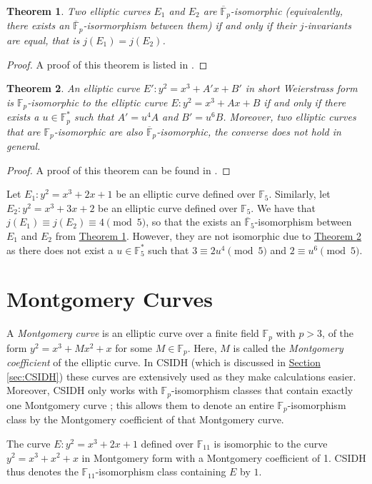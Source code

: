 \documentclass[openany, a4paper, 10pt]{book}
\theoremstyle{plain}
\newtheorem{theorem}{Theorem}[chapter]
\theoremstyle{plain}
\theoremstyle{plain}
\theoremstyle{definition}
\theoremstyle{plain}
\theoremstyle{definition}
\theoremstyle{remark}
\newcommand{\theoref}[1]{\hyperref[#1]{Theorem \ref{#1}}}
\newcommand{\secref}[1]{\hyperref[#1]{Section \ref{#1}}}
\begin{document}
\begin{theorem}\label{j-isomorphic}
    Two elliptic curves $E_1$ and $E_2$ are $\overline{\mathbb F}_p$-isomorphic (equivalently, there exists an $\overline{\mathbb F}_p$-isormorphism between them) if and only if their $j$-invariants are equal, that is $j(E_1) = j(E_2)$.
\end{theorem}
\begin{proof}
    A proof of this theorem is listed in \cite[III.1.4(b)]{arithmetic}.
\end{proof}
\begin{theorem}\label{Fp-isomorphic}
    An elliptic curve $E': y^2 = x^3+A'x + B'$ in short Weierstrass form is $\mathbb F_p$-isomorphic to the elliptic curve $E: y^2 = x^3+Ax+B$ if and only if there exists a $u \in \mathbb F_p^*$ such that $A' = u^4A$ and $B' = u^6B$.
    Moreover, two elliptic curves that are $\mathbb F_p$-isomorphic are also $\overline{\mathbb F}_p$-isomorphic, the converse does not hold in general.
\end{theorem}
\begin{proof}
    A proof of this theorem can be found in \cite[Theorems~2.2.2-2.2.4]{isom_class}.
\end{proof}

\begin{examplebox}


    Let $E_1: y^2 = x^3 + 2x + 1$ be an elliptic curve defined over $\mathbb F_5$.
    Similarly, let $E_2: y^2 = x^3+3x+2$ be an elliptic curve defined over $\mathbb F_5$.
    We have that $j(E_1) \equiv j(E_2) \equiv 4 \pmod 5$, so that the exists an $\overline{\mathbb F}_5$-isomorphism between $E_1$ and $E_2$ from \theoref{j-isomorphic}.
    However, they are not isomorphic due to \theoref{Fp-isomorphic} as there does not exist a $u \in \mathbb F_5^*$ such that $3\equiv 2u^4 \pmod 5$ and $2 \equiv u^6 \pmod 5$.
\end{examplebox}


\section{Montgomery Curves}\label{sec:mont_curves}
A \textit{Montgomery curve} is an elliptic curve over a finite field $\mathbb F_p$ with $p>3$, of the form $y^2=x^3+Mx^2+x$ for some $M \in \mathbb F_p$.
Here, $M$ is called the \textit{Montgomery coefficient} of the elliptic curve.
In CSIDH \cite{CSIDH} (which is discussed in \secref{sec:CSIDH}) these curves are extensively used as they make calculations easier.
Moreover, CSIDH only works with $\mathbb F_p$-isomorphism classes that contain exactly one Montgomery curve \cite[p.~5]{CSIDH}; this allows them to denote an entire $\mathbb F_p$-isomorphism class by the Montgomery coefficient of that Montgomery curve.
\begin{examplebox}
    The curve $E: y^2=x^3+2x+1$ defined over $\mathbb F_{11}$ is isomorphic to the curve $y^2 = x^3 + x^2 + x$ in Montgomery form with a Montgomery coefficient of 1.
    CSIDH thus denotes the $\mathbb F_{11}$-isomorphism class containing $E$ by $1$.
\end{examplebox}
\end{document}
